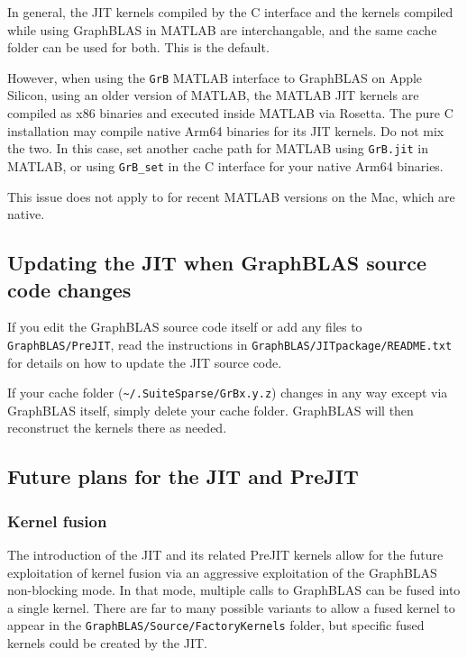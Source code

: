 In general, the JIT kernels compiled by the C interface and the kernels
compiled while using GraphBLAS in MATLAB are interchangable, and the same cache
folder can be used for both.  This is the default.

However, when using the \verb'GrB' MATLAB interface to GraphBLAS on Apple
Silicon, using an older version of MATLAB, the MATLAB JIT kernels are compiled
as x86 binaries and executed inside MATLAB via Rosetta.  The pure C
installation may compile native Arm64 binaries for its JIT kernels.  Do not mix
the two.  In this case, set another cache path for MATLAB using \verb'GrB.jit'
in MATLAB, or using \verb'GrB_set' in the C interface for your native Arm64
binaries.

This issue does not apply to for recent MATLAB versions on the Mac,
which are native.

\subsection{Updating the JIT when GraphBLAS source code changes}

If you edit the GraphBLAS source code itself or add any files to
\verb'GraphBLAS/PreJIT', read the instructions in
\verb'GraphBLAS/JITpackage/README.txt' for details on how to update the JIT
source code.

If your cache folder (\verb'~/.SuiteSparse/GrBx.y.z') changes in any way
except via GraphBLAS itself, simply delete your cache folder.  GraphBLAS will
then reconstruct the kernels there as needed.

\subsection{Future plans for the {\sf JIT} and {\sf PreJIT}}
\label{jit_future}

\subsubsection{Kernel fusion}
The introduction of the JIT and its related PreJIT kernels allow for the future
exploitation of kernel fusion via an aggressive exploitation of the GraphBLAS
non-blocking mode.  In that mode, multiple calls to GraphBLAS can be fused into
a single kernel.  There are far to many possible variants to allow a fused
kernel to appear in the \verb'GraphBLAS/Source/FactoryKernels' folder, but
specific fused kernels could be created by the JIT.

